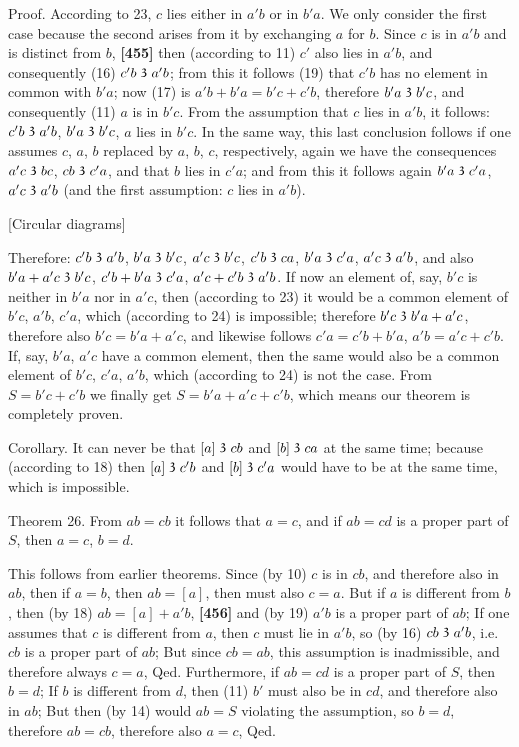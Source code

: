 \documentclass[leqno]{article}
\newcommand\partof{\mathrel{\raisebox{0.45ex}{$\mathfrak{3}$}}}
\begin{document}
Proof. According to 23, $c$ lies either in $a'b$ or in $b'a$. We only consider the first case because the second arises from it by exchanging $a$ for $b$. 
Since $c$ is in $a'b$ and is distinct from $b$, \textbf{[455]} then (according to 11) $c'$ also lies in $a'b$, and consequently (16) $c'b \partof a'b$; from this it follows (19) that $c'b$ has no element in common with $b'a$; now (17) is $a'b+b'a=b'c+c'b$, therefore $b'a \partof b'c$, and consequently (11) $a$ is in $b'c$. 
From the assumption that $c$ lies in $a'b$, it follows: $c'b \partof a'b$, $b'a \partof b'c$, $a$ lies in $b'c$. 
In the same way, this last conclusion follows if one assumes $c$, $a$, $b$ replaced by $a$, $b$, $c$, respectively, again we have the consequences $a'c \partof bc$, $cb \partof c'a$, and that $b$ lies in $c'a$; and from this it follows again $b'a \partof c'a$, $a'c \partof a'b$ (and the first assumption: $c$ lies in $a'b$).

\bigskip

[Circular diagrams]

\bigskip

Therefore: $c'b \partof a'b$, $b'a \partof b'c$, $a'c \partof b'c$, $c'b \partof ca$, $b'a \partof c'a$, $a'c \partof a'b$, and also $b'a + a'c \partof b'c$, $c'b + b'a \partof c'a$, $a'c + c'b \partof a'b$. 
If now an element of, say, $b'c$ is neither in $b'a$ nor in $a'c$, then (according to 23) it would be a common element of $b'c$, $a'b$, $c'a$, which (according to 24) is impossible; therefore $b'c \partof b'a + a'c$, therefore also $b'c=b'a + a'c$, and likewise follows $c'a=c'b+b'a$, $a'b=a'c+c'b$. If, say, $b'a$, $a'c$ have a common element, then the same would also be a common element of $b'c$, $c'a$, $a'b$, which (according to 24) is not the case. 
From $S=b'c+c'b$ we finally get $S=b'a+a'c+c'b$, which means our theorem is completely proven.

Corollary. It can never be that $[a] \partof cb$ and $[b] \partof ca$ at the same time; because (according to 18) then $[a] \partof c'b$ and $[b] \partof c'a$ would have to be at the same time, which is impossible.

Theorem 26. From $ab=cb$ it follows that $a=c$, and if $ab=cd$ is a proper part of $S$, then $a=c$, $b = d$.

This follows from earlier theorems. 
Since (by 10) $c$ is in $cb$, and therefore also in $ab$, then if $a=b$, then $ab = [a]$, then must also $c=a$. 
But if $a$ is different from $b$, then (by 18) $ab = [a]+a'b$, \textbf{[456]} and (by 19) $a'b$ is a proper part of $ab$; 
If one assumes that $c$ is different from $a$, then $c$ must lie in $a'b$, so (by 16) $cb \partof a'b$, i.e. $cb$ is a proper part of $ab$; 
But since $cb=ab$, this assumption is inadmissible, and therefore always $c=a$, Qed. 
Furthermore, if $ab=cd$ is a proper part of $S$, then $b=d$; If $b$ is different from $d$, then (11) $b'$ must also be in $cd$, and therefore also in $ab$; But then (by 14) would $ab = S$ violating the assumption, so $b=d$, therefore $ab=cb$, therefore also $a=c$, Qed.
\end{document}

